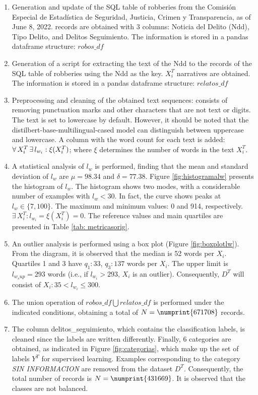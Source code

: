 \documentclass[onecolumn, journal, english, 12pt, a4paper]{IEEEtran} %
\newcommand{\modelohuggingface}{distilbert-base-multilingual-cased}
\theoremstyle{definition}
\begin{document}
\begin{enumerate}
\item Generation and update of the SQL table of robberies from the
  Comisión Especial de Estadística de Seguridad, Justicia, Crimen y
  Transparencia, as of June 8, 2022.  records are
  obtained with 3 columns: Noticia del Delito (Ndd), Tipo Delito, and
  Delitos Seguimiento. The information is stored in a pandas dataframe
  structure: $robos\_df$
\item Generation of a script for extracting the text of the Ndd to the
  records of the SQL table of robberies using the Ndd as the
  key.  $X^T_i$ narratives are obtained. The
  information is stored in a pandas dataframe structure: $relatos\_df$
\item Preprocessing and cleaning of the obtained text sequences:
  consists of removing punctuation marks and other characters that are
  not text or digits. The text is set to lowercase by
  default. However, it should be noted that the \modelohuggingface
  model can distinguish between uppercase and lowercase. A column with
  the word count for each text is added:
  $\forall \thinspace X^T_i \thinspace \exists \thinspace l_{w_{i}}:
  \xi(X^T_i)$; where $\xi$ determines the number of words in the text
  $X^T_i$.
\item A statistical analysis of $l_w$ is performed, finding that the
  mean and standard deviation of $l_w$ are $\mu = 98.34$ and
  $\delta=77.38$. Figure \ref{fig:histogramalw} presents the histogram
  of $l_w$. The histogram shows two modes, with a considerable number
  of examples with $l_w< 30$. In fact, the curve shows peaks at
  $l_w \in \{7, 100\}$. The maximum and minimum values: 0 and 914,
  respectively. $\exists \, X^T_i:l_{w_{i}} = \xi(X^T_i)=0$. The
  reference values and main quartiles are presented in Table \ref{tab:
    metricasorig}.
\item An outlier analysis is performed using a box plot (Figure
  \ref{fig:boxplotlw}). From the diagram, it is observed that the
  median is 52 words per $X_i$. Quartiles 1 and 3 have $q_1:33$,
  $q_3:137$ words per $X_i$. The upper limit is $l_{w_sup} = 293$
  words (i.e., if $l_{w_i} > 293$, $X_i$ is an outlier). Consequently,
  $D^T$ will consist of $X_i:35< l_{w_i} \leq 300$.
\item The union operation of $robos\_df \bigcup relatos\_df$ is
  performed under the indicated conditions, obtaining a total of
  $N = \numprint{671708}$ records.
\item The column delitos\_seguimiento, which contains the
  classification labels, is cleaned since the labels are written
  differently. Finally, 6 categories are obtained, as indicated in
  Figure \ref{fig:categorias}, which make up the set of labels $Y^T$
  for supervised learning. Examples corresponding to the category
  \emph{SIN INFORMACION} are removed from the dataset
  $D^T$. Consequently, the total number of records is
  $N = \numprint{431669}$. It is observed that the classes are not
  balanced.
    

\end{enumerate}
\end{document}
